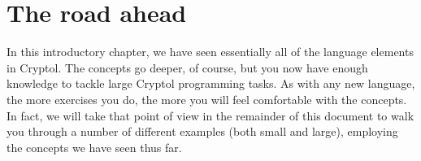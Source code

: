 \section{The road ahead}
\label{sec:road-ahead}

In this introductory chapter, we have seen essentially all of the
language elements in Cryptol. The concepts go deeper, of course, but
you now have enough knowledge to tackle large Cryptol programming
tasks. As with any new language, the more exercises you do, the more
you will feel comfortable with the concepts. In fact, we will take
that point of view in the remainder of this document to walk you
through a number of different examples (both small and large),
employing the concepts we have seen thus far.

